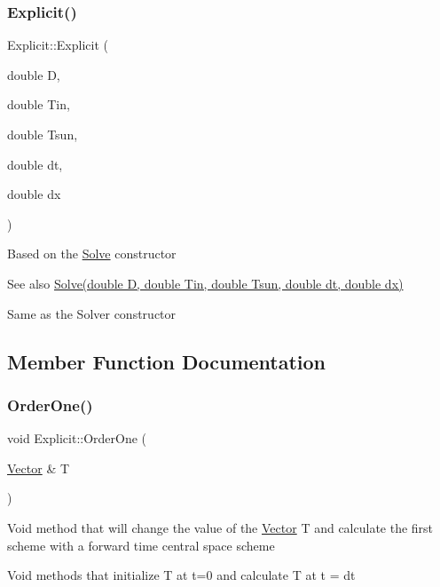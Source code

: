 \subsubsection{\texorpdfstring{Explicit()}{Explicit()}\hspace{0.1cm}{\footnotesize\ttfamily [2/2]}}
{\footnotesize\ttfamily Explicit\+::\+Explicit (\begin{DoxyParamCaption}\item[{double}]{D,  }\item[{double}]{Tin,  }\item[{double}]{Tsun,  }\item[{double}]{dt,  }\item[{double}]{dx }\end{DoxyParamCaption})}

Based on the \hyperlink{class_solve}{Solve} constructor \begin{DoxySeeAlso}{See also}
\hyperlink{class_solve_a1e0efad6dcf6b09759dd38df7aa08db8}{Solve(double D, double Tin, double Tsun, double dt, double dx)}
\end{DoxySeeAlso}
Same as the Solver constructor 

\subsection{Member Function Documentation}
\mbox{\label{class_explicit_a6069720017eb2bb0d989b2557c162c97}} 
\subsubsection{\texorpdfstring{Order\+One()}{OrderOne()}}
{\footnotesize\ttfamily void Explicit\+::\+Order\+One (\begin{DoxyParamCaption}\item[{\hyperlink{class_vector}{Vector} \&}]{T }\end{DoxyParamCaption})}

Void method that will change the value of the \hyperlink{class_vector}{Vector} T and calculate the first scheme with a forward time central space scheme

Void methods that initialize T at t=0 and calculate T at t = dt \mbox{\label{class_explicit_ac99aa17bfd95f66b33e5c0ecf0e53785}} 
